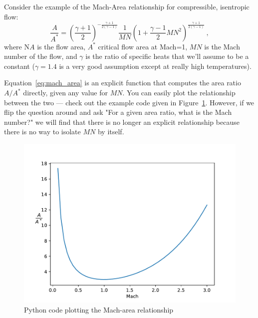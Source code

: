 \documentclass[conf]{new-aiaa}
\begin{document}
    Consider the example of the Mach-Area relationship for compressible, isentropic flow: 
    \begin{equation}
        \frac{A}{A^*} = \left(\frac{\gamma+1}{2}\right)^{-\frac{\gamma+1}{2(\gamma-1)}} 
                        \frac{1}{MN} 
                        \left( 1 + \frac{\gamma-1}{2}MN^2 \right)^{\frac{\gamma+1}{2(\gamma-1)}} \ ,
                        \label{eq:mach_area}
    \end{equation}
    where N$A$ is the flow area, $A^*$ critical flow area at Mach=1, $MN$ is the Mach number of the flow, and $\gamma$ is the ratio of specific heats that we'll assume to be a constant ($\gamma=1.4$ is a very good assumption except at really high temperatures).

    Equation~\eqref{eq:mach_area} is an explicit function that computes the area ratio $A/A^*$ directly, given any value for $MN$. 
    You can easily plot the relationship between the two --- check out the example code given in Figure~\ref{fig:mach-area}. 
    However, if we flip the question around and ask "For a given area ratio, what is the Mach number?" we will find that there is no longer an explicit relationship because there is no way to isolate $MN$ by itself. 
    \begin{figure}[H]
        \centering
        
        \includegraphics[width=.75\textwidth]{mach_area.pdf}
        \caption{Python code plotting the Mach-area relationship}
        \label{fig:mach-area}
    \end{figure}
\end{document}
